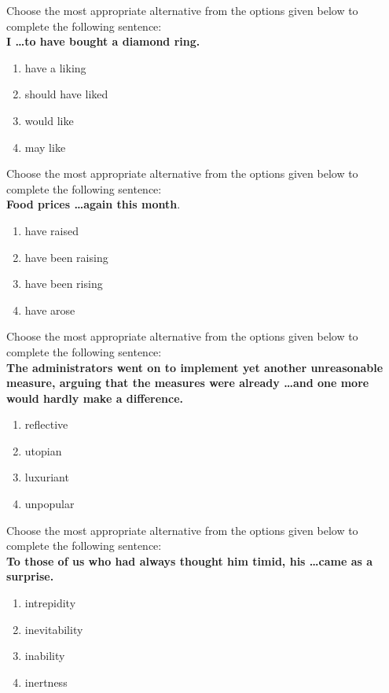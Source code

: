     \item Choose the most appropriate alternative from the options given below to complete the following sentence: \\
   \textbf{ I \dots to have bought a diamond ring.}
    \begin{enumerate}
        \item have a liking
        \item should have liked
        \item would like
        \item may like
    \end{enumerate}

    \item Choose the most appropriate alternative from the options given below to complete the following sentence: \\
    \textbf{Food prices \dots again this month}.
    \begin{enumerate}
        \item have raised
        \item have been raising
        \item have been rising
        \item have arose
    \end{enumerate}

    \item Choose the most appropriate alternative from the options given below to complete the following sentence: \\
    \textbf{The administrators went on to implement yet another unreasonable measure, arguing that the measures were already \dots and one more would hardly make a difference.}
    \begin{enumerate}
        \item reflective
        \item utopian
        \item luxuriant
        \item unpopular
    \end{enumerate}

    \item Choose the most appropriate alternative from the options given below to complete the following sentence: \\
   \textbf{ To those of us who had always thought him timid, his \dots came as a surprise.}
    \begin{enumerate}
        \item intrepidity
        \item inevitability
        \item inability
        \item inertness
    \end{enumerate}

